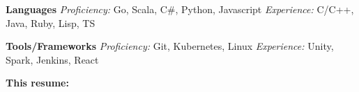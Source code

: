 



  \vspace{5pt}
  \textbf{Languages}\quad
    \emph{Proficiency:} Go, Scala, C\#, Python, Javascript
    \quad
    \emph{Experience:} C/C++, Java, Ruby, Lisp, TS

  \vspace{5pt}
  \textbf{Tools/Frameworks}\quad
    \emph{Proficiency:} Git, Kubernetes, Linux
    \quad
    \emph{Experience:} Unity, Spark, Jenkins, React

  \vspace{5pt}




  \textbf{This resume:}\enspace


